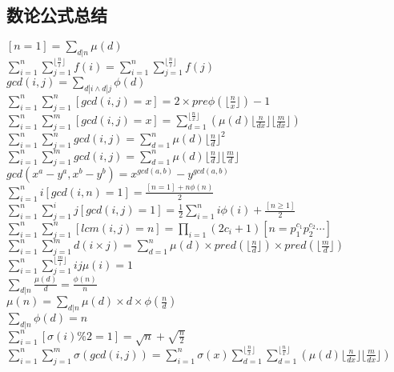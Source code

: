 \documentclass[twocolumn,a4]{article}
\begin{document}
\subsection{数论公式总结}
\begin{large}
    $\displaystyle [n=1]=\sum_{d|n}\mu (d)$\\
    $\displaystyle \sum_{i=1}^n\sum_{j=1}^{\lfloor \frac{n}{i} \rfloor }f(i)=\sum_{i=1}^{n}\sum_{j=1}^{\lfloor \frac{n}{i} \rfloor}f(j)$\\
    $\displaystyle gcd(i,j)=\sum_{d|i \wedge  d|j}\phi (d)$\\
    $\displaystyle \sum_{i=1}^{n}\sum_{j=1}^{n}[gcd(i,j)=x]=2 \times pre\phi (\lfloor \frac{n}{x} \rfloor)-1$\\
    $\displaystyle \sum_{i=1}^{n}\sum_{j=1}^{m}[gcd(i,j)=x]=\sum_{d=1}^{\lfloor \frac{n}{x} \rfloor}\left(\mu(d) \lfloor \frac{n}{dx} \rfloor  \lfloor \frac{m}{dx} \rfloor\right)$\\
    $\displaystyle \sum_{i=1}^{n}\sum_{j=1}^{n}gcd(i,j)=\sum_{d=1}^{n}\mu(d){\lfloor \frac{n}{d} \rfloor}^2$\\
    $\displaystyle \sum_{i=1}^{n}\sum_{j=1}^{m}gcd(i,j)=\sum_{d=1}^{n}\mu(d){\lfloor \frac{n}{d} \rfloor}{\lfloor \frac{m}{d} \rfloor}$\\
    $\displaystyle gcd(x^a-y^a,x^b-y^b)=x^{gcd(a,b)}-y^{gcd(a,b)}$\\
    $\displaystyle \sum_{i=1}^{n}i[gcd(i,n)=1]=\frac{[n=1]+n\phi(n)}{2}$
    $\displaystyle\sum_{i=1}^{n}\sum_{j=1}^{i}j[gcd(i,j)=1]=\frac{1}{2}\sum_{i=1}^{n}i\phi(i)+\frac{[n \geq 1]}{2}$\\
    $\displaystyle \sum_{i=1}^{n}\sum_{j=1}^{n}[lcm(i,j)=n]=\prod_{i=1} (2c_i+1)$$[n=p_1^{c_1}p_2^{c_2}\cdots]$\\
    $\displaystyle \sum_{i=1}^{n}\sum_{j=1}^{m}d(i\times j)=\sum_{d=1}^{n}\mu(d)\times pred(\lfloor \frac{n}{d} \rfloor) \times pred(\lfloor \frac{m}{d}\rfloor)$\\
    $\displaystyle \sum_{i=1}^{n}\sum_{j=1}^{\lfloor \frac{m}{i} \rfloor}ij\mu(i)=1$\\
    $\displaystyle \sum_{d|n}\frac{\mu(d)}{d}=\frac{\phi(n)}{n}$\\
    $\displaystyle \mu(n)=\sum_{d|n}\mu(d)\times d\times \phi(\frac{n}{d})$\\
    $\displaystyle \sum_{d|n}\phi(d)=n$\\
    $\displaystyle \sum_{i=1}^{n}[\sigma(i)\%2=1]=\sqrt{n}+\sqrt{\frac{n}{2}}$\\
    $\displaystyle \sum_{i=1}^{n}\sum_{j=1}^{m}\sigma (gcd(i,j))=\sum_{i=1}^{n}\sigma(x)\sum_{d=1}^{\lfloor \frac{n}{x} \rfloor}\sum_{d=1}^{\lfloor \frac{n}{x} \rfloor}\left(\mu(d) \lfloor \frac{n}{dx} \rfloor  \lfloor \frac{m}{dx} \rfloor\right)$\\
$$
\end{large}
\end{document}
